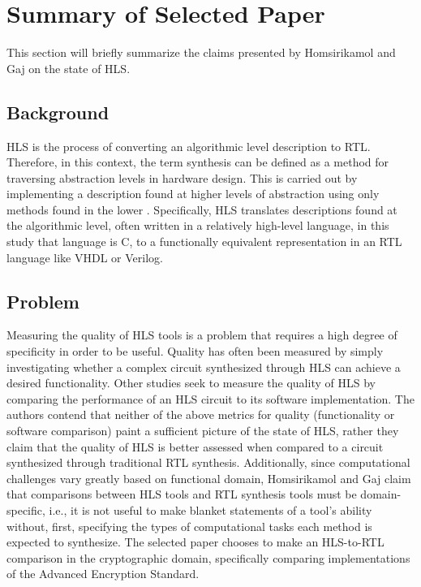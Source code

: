 \documentclass[onecolumn]{article}
\begin{document}
\section{Summary of Selected Paper}

This section will briefly summarize the claims presented by Homsirikamol and Gaj on the state of HLS.

\subsection{Background}

HLS is the process of converting an algorithmic level description to RTL. Therefore, in this context, the term synthesis can be defined as a method for traversing abstraction levels in hardware design. This is carried out by implementing a description found at higher levels of abstraction using only methods found in the lower \cite{churtl}. Specifically, HLS translates descriptions found at the algorithmic level, often written in a relatively high-level language, in this study that language is C, to a functionally equivalent representation in an RTL language like VHDL or Verilog.

\subsection{Problem}

Measuring the quality of HLS tools is a problem that requires a high degree of specificity in order to be useful. Quality has often been measured by simply investigating whether a complex circuit synthesized through HLS can achieve a desired functionality\cite{8}\cite{9}\cite{10}\cite{11}\cite{12}. Other studies \cite{3}\cite{4} seek to measure the quality of HLS by comparing the performance of an HLS circuit to its software implementation. The authors contend that neither of the above metrics for quality (functionality or software comparison) paint a sufficient picture of the state of HLS, rather they claim that the quality of HLS is better assessed when compared to a circuit synthesized through traditional RTL synthesis. Additionally, since computational challenges vary greatly based on functional domain, Homsirikamol and Gaj claim that comparisons between HLS tools and RTL synthesis tools must be domain-specific, i.e., it is not useful to make blanket statements of a tool's ability without, first, specifying the types of computational tasks each method is expected to synthesize. The selected paper chooses to make an HLS-to-RTL comparison in the cryptographic domain, specifically comparing implementations of the Advanced Encryption Standard.
\end{document}
